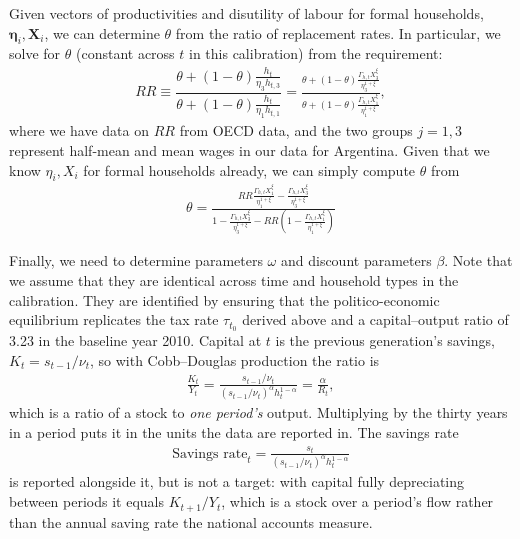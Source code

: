 Given vectors of productivities and disutility of labour for formal households, $\bm{\eta}_i, \bm{X}_i$, we can determine $\theta$ from the ratio of replacement rates. In particular, we solve for $\theta$ (constant across $t$ in this calibration) from the requirement:
 \begin{align*}
        RR \equiv \dfrac{\theta+(1-\theta)\frac{h_t}{\eta_3 h_{t,3}}}{\theta+(1-\theta)\frac{h_t}{\eta_1 h_{t,1}}} = \frac{\theta + (1-\theta)\frac{\Gamma_{h,t} X_3^{\xi}}{\eta_3^{1+\xi}}}{\theta+(1-\theta)\frac{\Gamma_{h,t} X_1^{\xi}}{\eta_1^{1+\xi}}},
\end{align*}
where we have data on $RR$ from OECD data, and the two groups $j=1, 3$ represent half-mean and mean wages in our data for Argentina. Given that we know $\eta_i, X_i$ for formal households already, we can simply compute $\theta$ from
\begin{align}
    \theta = \frac{RR \frac{\Gamma_{h,t} X_1^{\xi}}{\eta_1^{1+\xi}} - \frac{\Gamma_{h,t} X_3^{\xi}}{\eta_3^{1+\xi}}}{1-\frac{\Gamma_{h,t} X_3^{\xi}}{\eta_3^{1+\xi}}-RR\left(1-\frac{\Gamma_{h,t} X_1^{\xi}}{\eta_1^{1+\xi}}\right)}
\end{align}



Finally, we need to determine parameters $\omega$ and discount parameters $\beta$. Note that we assume that they are identical across time and household types in the calibration. They are identified by ensuring that the politico-economic equilibrium replicates the tax rate $\tau_{t_0}$ derived above and a capital--output ratio of 3.23 in the baseline year 2010. Capital at $t$ is the previous generation's savings, $K_t = s_{t-1}/\nu_t$, so with Cobb--Douglas production the ratio is
\begin{align*}
    \frac{K_t}{Y_t} = \frac{s_{t-1}/\nu_t}{\left(s_{t-1}/\nu_t\right)^{\alpha} h_t^{1-\alpha}} = \frac{\alpha}{R_t},
\end{align*}
which is a ratio of a stock to \emph{one period's} output. Multiplying by the thirty years in a period puts it in the units the data are reported in. The savings rate
\begin{align*}
    \text{Savings rate}_t = \frac{s_t}{\left(s_{t-1}/\nu_t\right)^{\alpha} h_t^{1-\alpha}}
\end{align*}
is reported alongside it, but is not a target: with capital fully depreciating between periods it equals $K_{t+1}/Y_t$, which is a stock over a period's flow rather than the annual saving rate the national accounts measure.


